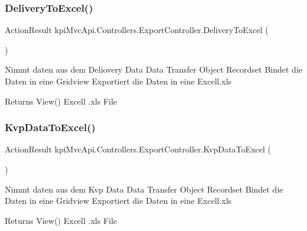 \subsubsection{\texorpdfstring{Delivery\+To\+Excel()}{DeliveryToExcel()}}
{\footnotesize\ttfamily Action\+Result kpi\+Mvc\+Api.\+Controllers.\+Export\+Controller.\+Delivery\+To\+Excel (\begin{DoxyParamCaption}{ }\end{DoxyParamCaption})\hspace{0.3cm}{\ttfamily [inline]}}



Nimmt daten aus dem Deliovery Data Data Transfer Object Recordset Bindet die Daten in eine Gridview Exportiert die Daten in eine Excell.\+xls 

\begin{DoxyReturn}{Returns}
View() Excell .xls File 
\end{DoxyReturn}
\mbox{\label{classkpi_mvc_api_1_1_controllers_1_1_export_controller_a5350dfcc0605aeb646490cdedd3374bc}} 
\subsubsection{\texorpdfstring{Kvp\+Data\+To\+Excel()}{KvpDataToExcel()}\hspace{0.1cm}{\footnotesize\ttfamily [1/2]}}
{\footnotesize\ttfamily Action\+Result kpi\+Mvc\+Api.\+Controllers.\+Export\+Controller.\+Kvp\+Data\+To\+Excel (\begin{DoxyParamCaption}{ }\end{DoxyParamCaption})\hspace{0.3cm}{\ttfamily [inline]}}



Nimmt daten aus dem Kvp Data Data Transfer Object Recordset Bindet die Daten in eine Gridview Exportiert die Daten in eine Excell.\+xls 

\begin{DoxyReturn}{Returns}
View() Excell .xls File 
\end{DoxyReturn}
\mbox{\label{classkpi_mvc_api_1_1_controllers_1_1_export_controller_a5350dfcc0605aeb646490cdedd3374bc}} 
